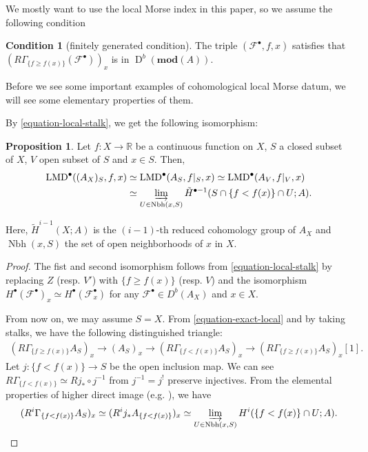 \documentclass[a4paper,dvipdfmx,reqno,12pt]{amsart}
\theoremstyle{definition}
\newtheorem{proposition}[theorem]{Proposition}
\newtheorem{condition}[theorem]{Condition}
\newcommand{\opn}[1]{\operatorname{#1}}
\newcommand{\catn}[1]{\mathbf{#1}}
\numberwithin{equation}{section}
\begin{document}
We mostly 
want to use the local Morse index in this paper,
so we assume the following condition

\begin{condition}[{finitely generated condition}]
The triple $(\mathcal{F}^{\bullet},f,x)$ satisfies
that $(R\Gamma_{\{f\geq f(x)\}}(\mathcal{F}^{\bullet}))_x$ 
is in $\opn{D}^{b}(\catn{mod}(A))$.
\end{condition}


Before we see some important examples of cohomological
local Morse datum, we will see some elementary
properties of them.







By \cref{equation-local-stalk}, we get the following
isomorphism:

\begin{proposition} \label{prop-local-morse-data}
Let $f\colon X\to \mathbb{R}$ be a continuous function
on $X$, $S$ a closed subset
of $X$, $V$ open subset of $S$ and $x\in S$. Then,
\begin{align} 
\opn{LMD}^{\bullet}((A_{X})_S,f,x
) &\simeq  
\opn{LMD}^{\bullet}(A_S,f|_S,x)
\simeq \opn{LMD}^{\bullet}(A_{V},f|_V,x) \\
&\simeq \varinjlim_{U\in\opn{Nbh}(x,S)} 
\tilde{H}^{\bullet-1}(S\cap \{f<f(x)\}\cap U;A).
\end{align}

Here, $\tilde{H}^{i-1}(X;A)$ is the $(i-1)$-th reduced cohomology 
group
of $A_X$ and $\opn{Nbh}(x,S)$ the set of open neighborhoods
of $x$ in $X$. 
\end{proposition}
\begin{proof}
The fist and second isomorphism follows from
\cref{equation-local-stalk} by 
replacing $Z$ (resp. $V'$) with 
$\{f\geq f(x)\}$ (resp. $V$) and the isomorphism
$H^{\bullet}(\mathcal{F}^{\bullet})_x\simeq 
H^{\bullet}(\mathcal{F}^{\bullet}_x)$ for any 
$\mathcal{F}^{\bullet}\in D^{b}(A_X)$ and $x\in X$.

From now on, we may assume $S=X$.
From \cref{equation-exact-local} and by taking stalks,
we have the following distinguished triangle:
\begin{align}
(R\Gamma_{\{f\geq f(x)\}}A_S)_x \to 
(A_S)_x\to 
(R\Gamma_{\{f<f(x)\}}A_S)_x\to 
(R\Gamma_{\{f\geq f(x)\}}A_S)_x[1].
\end{align}
Let $j\colon \{f<f(x)\}\to S$ be the open inclusion map. 
We can see 
$R\Gamma_{\{f< f(x)\}}\simeq Rj_*\circ j^{-1}$
from $j^{-1}=j^{!}$ preserve injectives.
From the elemental properties of higher direct image
(e.g. \cite[II. Proposition 5.11]{iversenCohomologySheaves1986a}),
we have
\begin{align}
(R^{i}\Gamma_{\{f< f(x)\}}A_S)_x\simeq 
(R^{i}j_* A_{\{f<f(x)\}})_x \simeq 
\varinjlim_{U\in \opn{Nbh}(x,S)} 
H^{i}(\{f<f(x)\}\cap U;A).
\end{align}
\end{proof}
\end{document}
